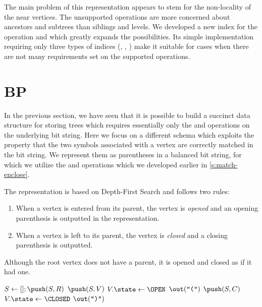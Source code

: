 The main problem of this representation appears to stem for the non-locality of the near vertices.
The unsupported operations are more concerned about ancestors and subtrees than siblings and levels.
We developed a new index for the operation \dep{} and \levelAny{} which greatly expands the possibilities.
Its simple implementation requiring only three types of indices (\rank{}, \select{}, \blockOfD{}) make it suitable for cases when there are not many requirements set on the supported operations.

\section{BP}

In the previous section, we have seen that it is possible to build a succinct data structure for storing trees which requires essentially only the \rank{} and \select{} operations on the underlying bit string.
Here we focus on a different schema which exploits the property that the two symbols associated with a vertex are correctly matched in the bit string.
We represent them as parentheses in a balanced bit string, for which we utilize the \match{} and \enclose{} operations which we developed earlier in \ref{s:match-enclose}.

The representation is based on Depth-First Search and follows two rules:
\begin{enumerate}
	\item When a vertex is entered from its parent, the vertex is \emph{opened} and an opening parenthesis is outputted in the representation.
	\item When a vertex is left to its parent, the vertex is \emph{closed} and a closing parenthesis is outputted.
\end{enumerate}
Although the root vertex does not have a parent, it is opened and closed as if it had one.

\begin{algorithm}
\begin{algorithmic}
	\State $S \gets []; \push(S, R)$ 
		 
			\State $\push(S, V)$ 
			\State $V.\state \gets \OPEN$
			\State $\out(\openingParen)$
				\State $\push(S, C)$
			\EndFor
		 
			\State $V.\state \gets \CLOSED$
			\State $\out(\closingParen)$
		\EndIf
	\EndWhile
\EndFunction
\end{algorithmic}
\end{algorithm}

